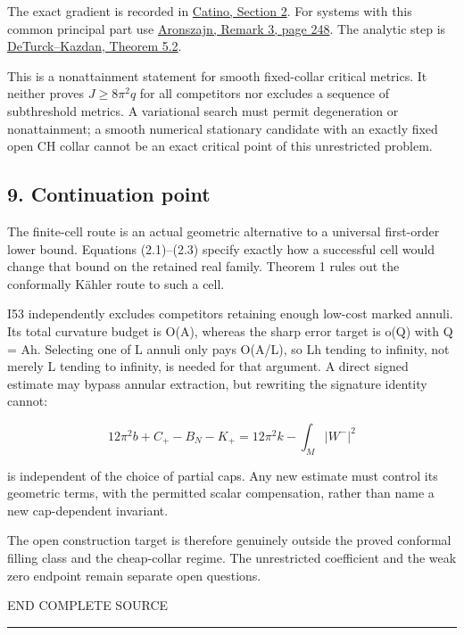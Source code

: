 \documentclass[
  10pt,
]{article}
\begin{document}
The exact gradient is recorded in
\href{https://arxiv.org/pdf/1404.0569}{Catino, Section 2}. For systems
with this common principal part use
\href{https://sites.math.washington.edu/~blwilson/Nodal/Aronszajn.pdf}{Aronszajn,
Remark 3, page 248}. The analytic step is
\href{https://www.numdam.org/article/ASENS_1981_4_14_3_249_0.pdf}{DeTurck--Kazdan,
Theorem 5.2}.

This is a nonattainment statement for smooth fixed-collar critical
metrics. It neither proves \(J\ge8\pi^2q\) for all competitors nor
excludes a sequence of subthreshold metrics. A variational search must
permit degeneration or nonattainment; a smooth numerical stationary
candidate with an exactly fixed open CH collar cannot be an exact
critical point of this unrestricted problem.

\hypertarget{continuation-point}{%
\subsection{9. Continuation point}\label{continuation-point}}

The finite-cell route is an actual geometric alternative to a universal
first-order lower bound. Equations (2.1)--(2.3) specify exactly how a
successful cell would change that bound on the retained real family.
Theorem 1 rules out the conformally Kähler route to such a cell.

I53 independently excludes competitors retaining enough low-cost marked
annuli. Its total curvature budget is O(A), whereas the sharp error
target is o(Q) with Q = Ah. Selecting one of L annuli only pays O(A/L),
so Lh tending to infinity, not merely L tending to infinity, is needed
for that argument. A direct signed estimate may bypass annular
extraction, but rewriting the signature identity cannot:

\[
 12\pi^2b+C_+-B_N-K_+
                   =12\pi^2k-\int_M|W^-|^2
\]

is independent of the choice of partial caps. Any new estimate must
control its geometric terms, with the permitted scalar compensation,
rather than name a new cap-dependent invariant.

The open construction target is therefore genuinely outside the proved
conformal filling class and the cheap-collar regime. The unrestricted
coefficient and the weak zero endpoint remain separate open questions.

END COMPLETE SOURCE

\begin{center}\rule{0.5\linewidth}{0.5pt}\end{center}
\end{document}
